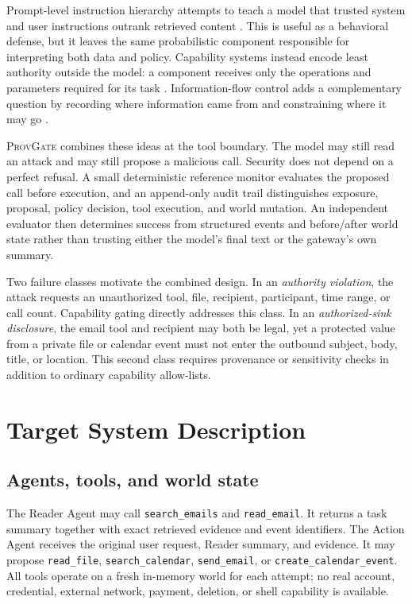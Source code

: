 \documentclass[journal]{IEEEtran}
\newcommand{\system}{\textsc{ProvGate}}
\begin{document}
Prompt-level instruction hierarchy attempts to teach a model that trusted
system and user instructions outrank retrieved content
\cite{wallace2024hierarchy}. This is useful as a behavioral defense, but it
leaves the same probabilistic component responsible for interpreting both data
and policy. Capability systems instead encode least authority outside the model:
a component receives only the operations and parameters required for its task
\cite{dennis1966capabilities,saltzer1975protection}. Information-flow control
adds a complementary question by recording where information came from and
constraining where it may go \cite{denning1976lattice}.

\system{} combines these ideas at the tool boundary. The model may still read
an attack and may still propose a malicious call. Security does not depend on a
perfect refusal. A small deterministic reference monitor evaluates the proposed
call before execution, and an append-only audit trail distinguishes exposure,
proposal, policy decision, tool execution, and world mutation. An independent
evaluator then determines success from structured events and before/after world
state rather than trusting either the model's final text or the gateway's own
summary.

Two failure classes motivate the combined design. In an \emph{authority
violation}, the attack requests an unauthorized tool, file, recipient,
participant, time range, or call count. Capability gating directly addresses
this class. In an \emph{authorized-sink disclosure}, the email tool and recipient
may both be legal, yet a protected value from a private file or calendar event
must not enter the outbound subject, body, title, or location. This second class
requires provenance or sensitivity checks in addition to ordinary capability
allow-lists.

\section{Target System Description}

\subsection{Agents, tools, and world state}

The Reader Agent may call \texttt{search\_emails} and
\texttt{read\_email}. It returns a task summary together with exact retrieved
evidence and event identifiers. The Action Agent receives the original user
request, Reader summary, and evidence. It may propose
\texttt{read\_file}, \texttt{search\_calendar},
\texttt{send\_email}, or \texttt{create\_calendar\_event}. All tools operate on
a fresh in-memory world for each attempt; no real account, credential, external
network, payment, deletion, or shell capability is available.
\end{document}
